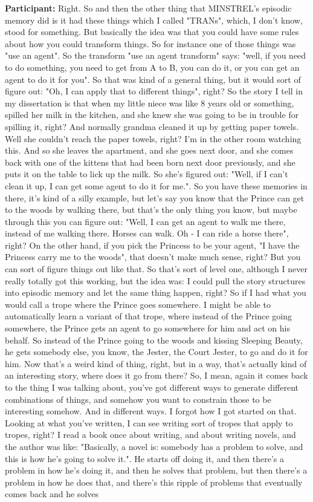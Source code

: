 \documentclass[11pt]{report}
\begin{document}
\begin{linenumbers}
\textbf{Participant:} Right. So and then the other thing that MINSTREL's episodic memory did is it had these things which I called "TRANs", which, I don't know, stood for something. But basically the idea was that you could have some rules about how you could transform things. So for instance one of those things was "use an agent". So the transform "use an agent transform" says: "well, if you need to do something, you need to get from A to B, you can do it, or you can get an agent to do it for you". So that was kind of a general thing, but it would sort of figure out: "Oh, I can apply that to different things", right? So the story I tell in my dissertation is that when my little niece was like 8 years old or something, spilled her milk in the kitchen, and she knew she was going to be in trouble for spilling it, right? And normally grandma cleaned it up by getting paper towels. Well she couldn't reach the paper towels, right? I'm in the other room watching this. And so she leaves the apartment, and she goes next door, and she comes back with one of the kittens that had been born next door previously, and she puts it on the table to lick up the milk. So she's figured out: "Well, if I can't clean it up, I can get some agent to do it for me.". So you have these memories in there, it's kind of a silly example, but let's say you know that the Prince can get to the woods by walking there, but that's the only thing you know, but maybe through this you can figure out: "Well, I can get an agent to walk me there, instead of me walking there. Horses can walk. Oh - I can ride a horse there", right? On the other hand, if you pick the Princess to be your agent, "I have the Princess carry me to the woods", that doesn't make much sense, right? But you can sort of figure things out like that. So that's sort of level one, although I never really totally got this working, but the idea was: I could pull the story structures into episodic memory and let the same thing happen, right? So if I had what you would call a trope where the Prince goes somewhere. I might be able to automatically learn a variant of that trope, where instead of the Prince going somewhere, the Prince gets an agent to go somewhere for him and act on his behalf. So instead of the Prince going to the woods and kissing Sleeping Beauty, he gets somebody else, you know, the Jester, the Court Jester, to go and do it for him. Now that's a weird kind of thing, right, but in a way, that's actually kind of an interesting story, where does it go from there? So, I mean, again it comes back to the thing I was talking about, you've got different ways to generate different combinations of things, and somehow you want to constrain those to be interesting somehow. And in different ways. I forgot how I got started on that. Looking at what you've written, I can see writing sort of tropes that apply to tropes, right? I read a book once about writing, and about writing novels, and the author was like: "Basically, a novel is: somebody has a problem to solve, and this is how he's going to solve it.". He starts off doing it, and then there's a problem in how he's doing it, and then he solves that problem, but then there's a problem in how he does that, and there's this ripple of problems that eventually comes back and he solves 
\end{linenumbers}
\end{document}
